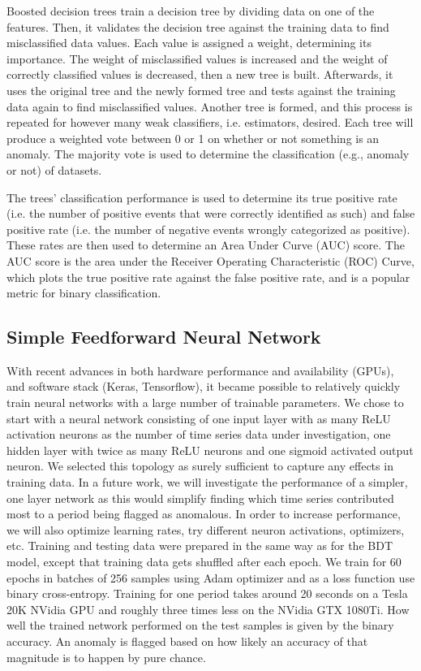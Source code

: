 \documentclass[5p]{elsarticle}
\begin{document}
Boosted decision trees train a decision tree by dividing data on one of the features. Then, it validates the decision tree against the training data to find misclassified data values. Each value is assigned a weight, determining its importance. The weight of misclassified values is increased and the weight of correctly classified values is decreased, then a new tree is built. Afterwards, it uses the original tree and the newly formed tree and tests against the training data again to find misclassified values. Another tree is formed, and this process is repeated for however many weak classifiers, i.e. estimators, desired. Each tree will produce a weighted vote between 0 or 1 on whether or not something is an anomaly. The majority vote is used to determine the classification (e.g., anomaly or not) of datasets.

The trees' classification performance is used to determine its true positive rate (i.e. the number of positive events that were correctly identified as such) and false positive rate (i.e. the number of negative events wrongly categorized as positive). These rates are then used to determine an Area Under Curve (AUC) score. The AUC score is the area under the Receiver Operating Characteristic (ROC) Curve, which plots the true positive rate against the false positive rate, and is a popular metric for binary classification.

\subsection{Simple Feedforward Neural Network}

With recent advances in both hardware performance and availability (GPUs), and software stack (Keras, Tensorflow), it became possible to relatively quickly train neural networks with a large number of trainable parameters. We chose to start with a neural network consisting of one input layer with as many ReLU activation neurons as the number of time series data under investigation, one hidden layer with twice as many ReLU neurons and one sigmoid activated output neuron. We selected this topology as surely sufficient to capture any effects in training data. In a future work, we will investigate the performance of a simpler, one layer network as this would simplify finding which time series contributed most to a period being flagged as anomalous. In order to increase performance, we will also optimize learning rates, try different neuron activations, optimizers,  etc.  
Training and testing data were prepared in the same way as for the BDT model, except that training data gets shuffled after each epoch. We train for 60 epochs in batches of 256 samples using Adam optimizer \cite{fifteen} and as a loss function use binary cross-entropy. Training for one period takes around 20 seconds on a Tesla 20K NVidia GPU and roughly three times less on the NVidia GTX 1080Ti. How well the trained network performed on the test samples is given by the binary accuracy. An anomaly is flagged based on how likely an accuracy of that magnitude is to happen by pure chance.
\end{document}
